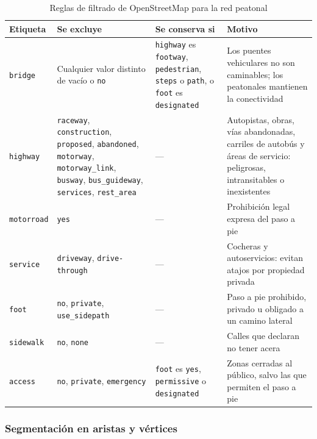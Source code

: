 \begin{table}[htbp]
\centering
\caption{Reglas de filtrado de OpenStreetMap para la red peatonal}
\label{tab:filtro_osm}
\footnotesize
\begin{tabular}{|>{\raggedright\arraybackslash}p{}|>{\raggedright\arraybackslash}p{}|>{\raggedright\arraybackslash}p{}|>{\raggedright\arraybackslash}p{}|}
\hline
\textbf{Etiqueta} & \textbf{Se excluye} & \textbf{Se conserva si} & \textbf{Motivo} \\ \hline
\texttt{bridge} & Cualquier valor distinto de vacío o \texttt{no} & \texttt{highway} es \texttt{footway}, \texttt{pedestrian}, \texttt{steps} o \texttt{path}, o \texttt{foot} es \texttt{designated} & Los puentes vehiculares no son caminables; los peatonales mantienen la conectividad \\ \hline
\texttt{highway} & \texttt{raceway}, \texttt{construction}, \texttt{proposed}, \texttt{abandoned}, \texttt{motorway}, \texttt{motorway\_link}, \texttt{busway}, \texttt{bus\_guideway}, \texttt{services}, \texttt{rest\_area} & --- & Autopistas, obras, vías abandonadas, carriles de autobús y áreas de servicio: peligrosas, intransitables o inexistentes \\ \hline
\texttt{motorroad} & \texttt{yes} & --- & Prohibición legal expresa del paso a pie \\ \hline
\texttt{service} & \texttt{driveway}, \texttt{drive-through} & --- & Cocheras y autoservicios: evitan atajos por propiedad privada \\ \hline
\texttt{foot} & \texttt{no}, \texttt{private}, \texttt{use\_sidepath} & --- & Paso a pie prohibido, privado u obligado a un camino lateral \\ \hline
\texttt{sidewalk} & \texttt{no}, \texttt{none} & --- & Calles que declaran no tener acera \\ \hline
\texttt{access} & \texttt{no}, \texttt{private}, \texttt{emergency} & \texttt{foot} es \texttt{yes}, \texttt{permissive} o \texttt{designated} & Zonas cerradas al público, salvo las que permiten el paso a pie \\ \hline
\end{tabular}
\end{table}

\subsubsection{Segmentación en aristas y vértices}

